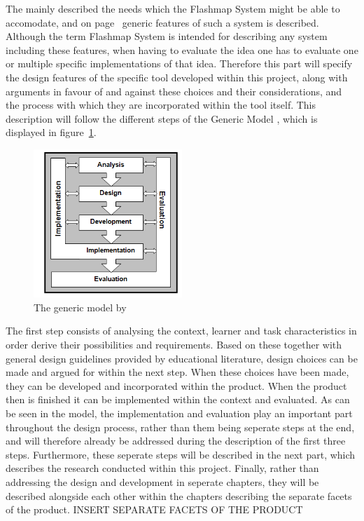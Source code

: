 The  mainly described the needs which the Flashmap System might be able to accomodate, and on page~\pageref{sec:intro_flashmap} generic features of such a system is described. Although the term Flashmap System is intended for describing any system including these features, when having to evaluate the idea one has to evaluate one or multiple specific implementations of that idea. Therefore this part will specify the design features of the specific tool developed within this project, along with arguments in favour of and against these choices and their considerations, and the process with which they are incorporated within the tool itself. This description will follow the different steps of the Generic Model \cite{genericmodel}, which is displayed in figure~\ref{fig:genericmodel}.

\begin{figure}[h]
    \centering
    \includegraphics[width=0.5\textwidth]{img/genericmodel}
    \caption{The generic model by \protect{}\label{fig:genericmodel}}
\end{figure}

The first step consists of analysing the context, learner and task characteristics in order derive their possibilities and requirements. Based on these together with general design guidelines provided by educational literature, design choices can be made and argued for within the next step. When these choices have been made, they can be developed and incorporated within the product. When the product then is finished it can be implemented within the context and evaluated. As can be seen in the model, the implementation and evaluation play an important part throughout the design process, rather than them being seperate steps at the end, and will therefore already be addressed during the description of the first three steps. Furthermore, these seperate steps will be described in the next part, which describes the research conducted within this project. Finally, rather than addressing the design and development in seperate chapters, they will be described alongside each other within the chapters describing the separate facets of the product. INSERT SEPARATE FACETS OF THE PRODUCT
